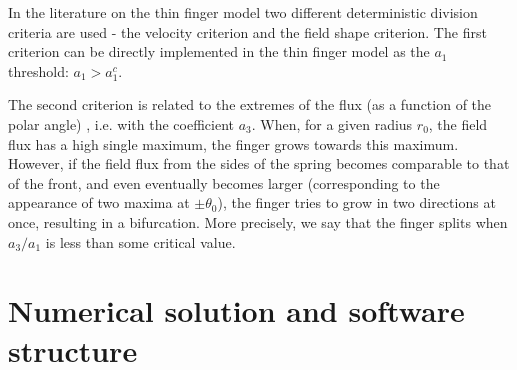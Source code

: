 \documentclass[]{pracamgr}
\begin{document}
    In the literature on the thin finger model two different deterministic division criteria are used - the velocity criterion and the field shape criterion. The first criterion can be directly implemented in the thin finger model as the $a_1$ threshold: $a_1 > a_1^c$.

    The second criterion is related to the extremes of the flux (as a function of the polar angle) \cite{petroff2013bifurcation, kaandorp2001algorithmic_Chapter4.4}, i.e. with the coefficient $a_3$. When, for a given radius $r_0$, the field flux has a high single maximum, the finger grows towards this maximum. However, if the field flux from the sides of the spring becomes comparable to that of the front, and even eventually becomes larger (corresponding to the appearance of two maxima at $\pm \theta_0$), the finger tries to grow in two directions at once, resulting in a bifurcation. More precisely, we say that the finger splits when $a_3/a_1$ is less than some critical value.

  \chapter{Numerical solution and software structure}
\end{document}
